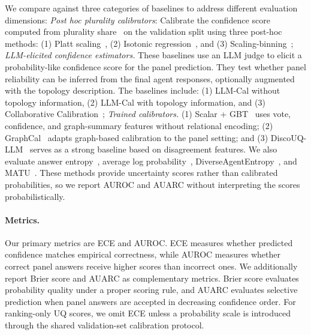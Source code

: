 We compare \methodname{} against three categories of baselines to address different evaluation dimensions: 
\textit{Post hoc plurality calibrators}:
Calibrate the confidence score computed from plurality share~\cite{kuncheva2004combining} on the validation split using three  post-hoc methods: (1) Platt scaling~\cite{platt1999probabilistic}, (2) Isotonic regression~\cite{zadrozny2002transforming}, and (3) Scaling-binning~\cite{kumar2019verified};
\textit{LLM-elicited confidence estimators.} 
These baselines use an LLM judge to elicit a probability-like confidence score for the panel prediction.
They test whether panel reliability can be inferred from the final agent responses, optionally augmented with the topology description.
The baselines include: (1) LLM-Cal without topology information, (2) LLM-Cal with topology information, and (3) Collaborative Calibration~\citep{yang2024confidence};
\textit{Trained calibrators.} 
(1) Scalar + GBT~\cite{ke2017lightgbm} uses vote, confidence, and graph-summary features without relational encoding; 
(2) GraphCal~\citep{li2025graph} adapts graph-based calibration to the panel setting; 
and (3) DiscoUQ-LLM~\citep{jiang2026discouq} serves as a strong baseline based on disagreement features.
We also evaluate answer entropy~\citep{kuhn2023semanticuncertaintylinguisticinvariances}, average log probability~\cite{kadavath2022languagemodelsmostlyknow}, DiverseAgentEntropy~\citep{feng2025rethinkingllmuncertaintymultiagent}, and MATU~\citep{chen2026responsecountsquantifyinguncertainty}. 
These methods provide uncertainty scores rather than calibrated probabilities, so we report AUROC and AUARC without interpreting the scores probabilistically.

\paragraph{Metrics.}
Our primary metrics are ECE and AUROC. 
ECE measures whether predicted confidence matches empirical correctness, while AUROC measures whether correct panel answers receive higher scores than incorrect ones. 
We additionally report Brier score and AUARC as complementary metrics. 
Brier score evaluates probability quality under a proper scoring rule, and AUARC evaluates selective prediction when panel answers are accepted in decreasing confidence order. 
For ranking-only UQ scores, we omit ECE unless a probability scale is introduced through the shared validation-set calibration protocol.

